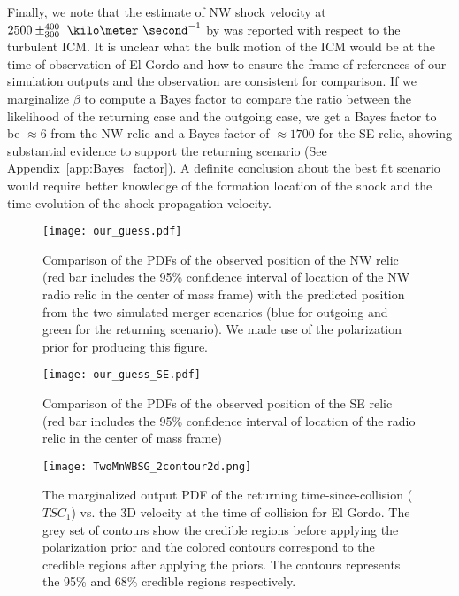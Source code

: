 Finally, we note that the estimate of NW shock velocity at $2500
\pm^{400}_{300}~\kilo\meter~\second^{-1}$ by \cite{L13} was reported with respect to
the turbulent ICM. 
It is unclear what the bulk motion
of the ICM would be at the time of observation of El Gordo and how to ensure the frame of
references of our simulation outputs and the observation are consistent for
comparison.  
If we marginalize $\beta$ to
compute a Bayes factor to compare the ratio between the likelihood of the
returning case and the outgoing case, we get a Bayes factor to be $\approx
6$ from the NW relic and a Bayes factor of $\approx 1700$ for the SE relic, showing substantial evidence to support the returning scenario 
(See Appendix~\ref{app:Bayes_factor}).  
A definite conclusion about the best fit scenario would require better
knowledge of the formation location of the shock and the time evolution of
the shock propagation velocity. 
\begin{figure}
	\texttt{[image: our\_guess.pdf]}
	\caption{Comparison of the PDFs of the observed position of the NW relic (red bar
		includes the 95\% confidence interval of location of the NW radio relic in the center of mass frame) with the predicted position from the two simulated merger
		scenarios (blue for outgoing and green for the returning scenario).
	We made use of the polarization prior for producing this figure.} 
	\label{fig:our_guessed_scenario}
\end{figure}
\begin{figure}
	\texttt{[image: our\_guess\_SE.pdf]}
	\caption{Comparison of the PDFs of the observed position of the SE relic (red bar
	includes the 95\% confidence interval of location of the radio relic in
the center of mass frame)}
\end{figure}
\begin{figure}
	\texttt{[image: TwoMnWBSG\_2contour2d.png]}
	\caption{The marginalized output PDF of the returning time-since-collision
($TSC_1$) vs. the 3D velocity at the time of collision for El Gordo. The
grey set of contours show the credible regions before applying the
polarization prior and the colored contours correspond to the credible
regions after applying the priors. The contours represents the 95\% and
68\% credible regions respectively. }
	\label{fig:TSC_v3D}
\end{figure}

